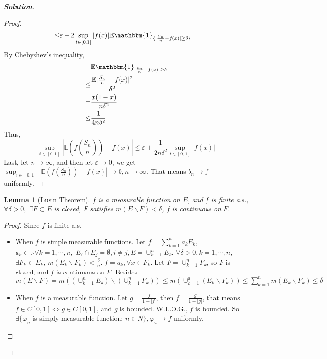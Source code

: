 \documentclass{ctexart}
\newenvironment{solution}{\begin{proof}[\textbf{Solution}]}{\end{proof}}
\renewcommand\phi{\varphi}
\renewcommand{\(}{\left(}
\renewcommand{\)}{\right)}
\newcommand{\E}{\mathbb{E}}
\newcommand{\R}{\mathbb{R}}
\newcommand{\shi}{\mathbbm{1}}
\renewcommand{\epsilon}{\varepsilon}
\newcommand{\minus}{\mathbin{\backslash}}
\newtheorem{lemma}{Lemma}
\begin{document}
\begin{solution}
\begin{proof}
\begin{equation}
\begin{aligned}
        \leq & \epsilon+2\sup_{t\in[0,1]}|f(x)|\E{\shi_{\{|\frac{S_n}{n}-f(x)|\geq\delta\}}}
      \end{aligned}
    \end{equation}
    By Chebyshev's inequality,
    \begin{equation}
      \begin{aligned}
             & \E{\shi_{|\frac{S_n}{n}-f(x)|\geq\delta}}   \\
        \leq & \frac{\E{|\frac{S_n}{n}-f(x)|^2}}{\delta^2} \\
        =    & \frac{x(1-x)}{n\delta^2}                    \\
        \leq & \frac{1}{4n\delta^2}
      \end{aligned}
    \end{equation}
    Thus,
    \begin{equation}
      \sup_{t\in[0,1]}|\E(f(\frac{S_n}{n}))-f(x)|\leq\epsilon+\frac{1}{2n\delta^2}\sup_{t\in[0,1]}|f(x)|
    \end{equation}
    Last, let $n\to\infty$, and then let $\epsilon\to 0$, we get $\sup_{t\in[0,1]}|\E(f(\frac{S_n}{n}))-f(x)|\to0,n\to\infty$.
    That means $b_n\to f$ uniformly.
  \end{proof}
  \begin{lemma}[Lusin Theorem]\label{lem:2}
    $f$ is a measurable function on $E$, and $f$ is finite a.s., $\forall \delta>0,$ $\exists F\subset E$ is closed, $F$ satisfies $m(E\minus F)<\delta$, $f$ is continuous on $F$.
  \end{lemma}
  \begin{proof}
    Since $f$ is finite a.s.
    \begin{itemize}
      \item When $f$ is simple measurable functions.
        Let $f=\sum_{k=1}^{n}a_kE_k$, $a_k\in \R\forall k=1,\cdots,n,$ $E_i\cap E_j=\emptyset, i\neq j, E=\cup_{k=1}^{n}E_k$.
        $\forall \delta>0,k=1,\cdots, n$, $\exists F_k\subset E_k$, $m(E_k\minus F_k)<\frac{\delta}{n}$. $f=a_k,\forall x\in F_k$.
        Let $F=\cup_{k=1}^n F_k$, so $F$ is closed, and $f$ is continuous on $F$.
        Besides, $m(E\minus F)= m((\cup_{k=1}^n E_k)\minus (\cup_{k=1}^n F_k))\leq m(\cup_{k=1}^n (E_k\minus F_k))\leq\sum_{k=1}^n m(E_k\minus F_k)\leq \delta$
      \item When $f$ is a measurable function. Let $g=\frac{f}{1+|f|}$, then $f=\frac{g}{1-|g|}$, that means $f\in C[0,1]\Leftrightarrow g\in C[0,1]$, and $g$ is bounded.
        W.L.O.G., $f$ is bounded. So $\exists\{\phi_n$ is simply measurable function: $n\in N\}, \phi_n\to f$ uniformly.

\end{itemize}
\end{proof}
\end{solution}
\end{document}
